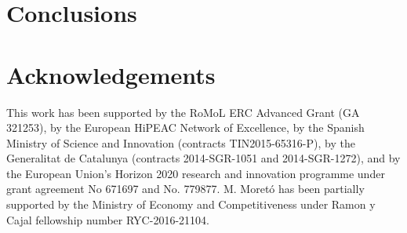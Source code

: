 \documentclass{llncs}
\begin{document}
\section{Conclusions}
\label{sec:conclusions}


\section*{Acknowledgements}
This work has been supported by the RoMoL ERC Advanced Grant (GA 321253), by the European HiPEAC Network of Excellence, by the Spanish Ministry of Science and Innovation (contracts TIN2015-65316-P), by the Generalitat de Catalunya (contracts 2014-SGR-1051 and 2014-SGR-1272), and by the European Union's Horizon 2020 research and innovation programme under grant agreement No 671697 and No. 779877.
M. Moret\'{o} has been partially supported by the Ministry of Economy and Competitiveness under Ramon y Cajal fellowship number RYC-2016-21104.


\linespread{0.5}





\end{document}
